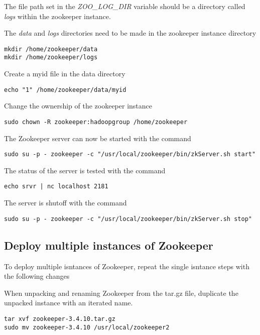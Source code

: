 The file path set in the \emph{ZOO\_LOG\_DIR} variable should be a
directory called \emph{logs} within the zookeeper instance.

The \emph{data} and \emph{logs} directories need to be made in the
zookeeper instance directory

\begin{lstlisting}
mkdir /home/zookeeper/data
mkdir /home/zookeeper/logs
\end{lstlisting}

Create a myid file in the data directory

\begin{lstlisting}
echo "1" /home/zookeeper/data/myid
\end{lstlisting}

Change the ownership of the zookeeper instance

\begin{lstlisting}
sudo chown -R zookeeper:hadoopgroup /home/zookeeper
\end{lstlisting}

The Zookeeper server can now be started with the command

\begin{lstlisting}
sudo su -p - zookeeper -c "/usr/local/zookeeper/bin/zkServer.sh start"
\end{lstlisting}

The status of the server is tested with the command

\begin{lstlisting}
echo srvr | nc localhost 2181
\end{lstlisting}

The server is shutoff with the command

\begin{lstlisting}
sudo su -p - zookeeper -c "/usr/local/zookeeper/bin/zkServer.sh stop"
\end{lstlisting}

\subsection{Deploy multiple instances of Zookeeper}

To deploy multiple isntances of Zookeeper, repeat the single isntance
steps with the following changes

When unpacking and renaming Zookeeper from the tar.gz file, duplicate
the unpacked instance with an iterated name.

\begin{lstlisting}
tar xvf zookeeper-3.4.10.tar.gz
sudo mv zookeeper-3.4.10 /usr/local/zookeeper2
\end{lstlisting}

